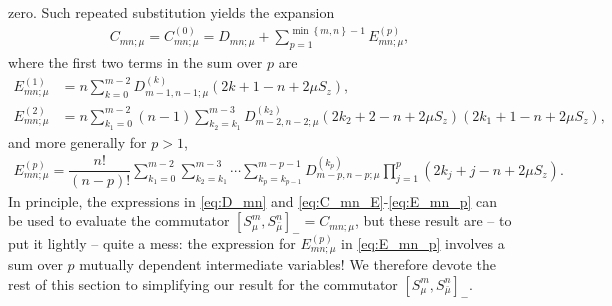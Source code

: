 \documentclass[aps,notitlepage,nofootinbib,11pt]{revtex4-1}
\newcommand{\f}[2]{\dfrac{#1}{#2}} %
\newcommand{\p}[1]{\left(#1\right)} %
\renewcommand{\sp}[1]{\left[#1\right]} %
\renewcommand{\set}[1]{\left\{#1\right\}} %
\newcommand{\bmu}{{\bar\mu}}
\newcommand{\1}{\mathds{1}}
\begin{document}
zero.  Such repeated substitution yields the expansion
\begin{align}
  C_{mn;\mu}
  = C_{mn;\mu}^{(0)}
  = D_{mn;\mu}
  + \sum_{p=1}^{\min\set{m,n}-1} E_{mn;\mu}^{(p)},
  \label{eq:C_mn_E}
\end{align}
where the first two terms in the sum over $p$ are
\begin{align}
  E_{mn;\mu}^{(1)}
  &= n \sum_{k=0}^{m-2} D_{m-1,n-1;\mu}^{(k)}
  \p{2k+1-n+2\mu S_z}, \\
  E_{mn;\mu}^{(2)}
  &= n \sum_{k_1=0}^{m-2} \p{n-1} \sum_{k_2=k_1}^{m-3}
  D_{m-2,n-2;\mu}^{(k_2)}
  \p{2k_2+2-n+2\mu S_z} \p{2k_1+1-n+2\mu S_z},
\end{align}
and more generally for $p>1$,
\begin{align}
  E_{mn;\mu}^{(p)}
  = \f{n!}{\p{n-p}!}
  \sum_{k_1=0}^{m-2} \sum_{k_2=k_1}^{m-3} \cdots\sum_{k_p=k_{p-1}}^{m-p-1}
  D_{m-p,n-p;\mu}^{(k_p)} \prod_{j=1}^p \p{2k_j+j-n+2\mu S_z}.
  \label{eq:E_mn_p}
\end{align}
In principle, the expressions in \eqref{eq:D_mn} and
\eqref{eq:C_mn_E}-\eqref{eq:E_mn_p} can be used to evaluate the
commutator $\sp{S_\mu^m,S_\bmu^n}_- = C_{mn;\mu}$, but these result
are -- to put it lightly -- quite a mess: the expression for
$E_{mn;\mu}^{(p)}$ in \eqref{eq:E_mn_p} involves a sum over $p$
mutually dependent intermediate variables!  We therefore devote the
rest of this section to simplifying our result for the commutator
$\sp{S_\mu^m,S_\bmu^n}_-$.
\end{document}
